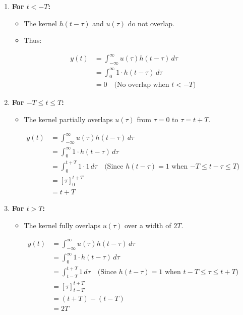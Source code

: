 \begin{enumerate}
    \item \textbf{For \( t < -T \):}
    \begin{itemize}
        \item The kernel \( h(t - \tau) \) and \( u(\tau) \) do not overlap.
        \item Thus:
    \end{itemize}
    
    \begin{align}
        y(t) &= \int_{-\infty}^{\infty} u(\tau) h(t - \tau) \, d\tau \\
        &= \int_{0}^{\infty} 1 \cdot h(t - \tau) \, d\tau \\
        &= 0 \quad \text{(No overlap when $t < -T$)}
    \end{align}
    
    \item \textbf{For \( -T \leq t \leq T \):}
    \begin{itemize}
        \item The kernel partially overlaps \( u(\tau) \) from \( \tau = 0 \) to \( \tau = t + T \).
    \end{itemize}
    
    \begin{align}
        y(t) &= \int_{-\infty}^{\infty} u(\tau) h(t - \tau) \, d\tau \\
        &= \int_{0}^{\infty} 1 \cdot h(t - \tau) \, d\tau \\
        &= \int_{0}^{t+T} 1 \cdot 1 \, d\tau \quad \text{(Since $h(t-\tau)=1$ when $-T \leq t-\tau \leq T$)} \\
        &= [{\tau}]_{0}^{t+T} \\
        &= t + T
    \end{align}
    
    \item \textbf{For \( t > T \):}
    \begin{itemize}
        \item The kernel fully overlaps \( u(\tau) \) over a width of \( 2T \).
    \end{itemize}
    
    \begin{align}
        y(t) &= \int_{-\infty}^{\infty} u(\tau) h(t - \tau) \, d\tau \\
        &= \int_{0}^{\infty} 1 \cdot h(t - \tau) \, d\tau \\
        &= \int_{t-T}^{t+T} 1 \, d\tau \quad \text{(Since $h(t-\tau)=1$ when $t-T \leq \tau \leq t+T$)} \\
        &= [{\tau}]_{t-T}^{t+T} \\
        &= (t+T) - (t-T) \\
        &= 2T
    \end{align}
\end{enumerate}

